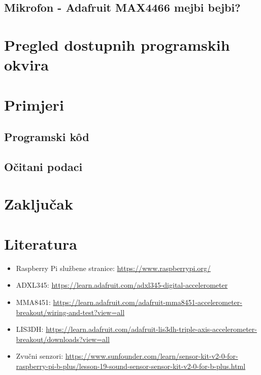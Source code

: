 \documentclass[12pt,a4paper]{article}
\begin{document}
	\newpage
	\subsection{Mikrofon - Adafruit MAX4466 mejbi bejbi?}
\newpage
\section{Pregled dostupnih programskih okvira}

\newpage
\section{Primjeri}
	\subsection{Programski kôd}
	\subsection{Očitani podaci}

\newpage
\section{Zaključak}

\newpage
\section{Literatura}

\begin{itemize}
	\item Raspberry Pi službene stranice: \url{https://www.raspberrypi.org/}
	\item ADXL345: \url{https://learn.adafruit.com/adxl345-digital-accelerometer}
	\item MMA8451: \url{https://learn.adafruit.com/adafruit-mma8451-accelerometer-breakout/wiring-and-test?view=all}
	\item LIS3DH: \url{https://learn.adafruit.com/adafruit-lis3dh-triple-axis-accelerometer-breakout/downloads?view=all}
	\item Zvučni senzori: \url{https://www.sunfounder.com/learn/sensor-kit-v2-0-for-raspberry-pi-b-plus/lesson-19-sound-sensor-sensor-kit-v2-0-for-b-plus.html}
\end{itemize}
\end{document}
